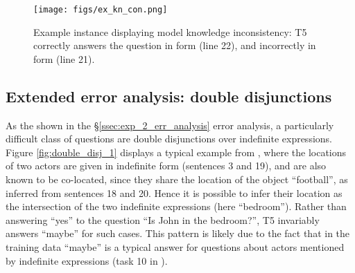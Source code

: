 \begin{figure}[]
\centering
\texttt{[image: figs/ex\_kn\_con.png]}

\caption{\label{fig:kn_con_example} Example  instance displaying model knowledge inconsistency: T5 correctly answers the question in \wherep form (line 22), and incorrectly in \yesno form (line 21).}
\end{figure}

\subsection{Extended error analysis: double disjunctions}
\label{ssec:ext_err_double_disj}

As the shown in the \S\ref{ssec:exp_2_err_analysis} error analysis, a particularly difficult class of questions are double disjunctions over indefinite expressions. Figure \ref{fig:double_disj_1} displays a typical example from , where the locations of two actors are given in indefinite form (sentences 3 and 19), and are also known to be co-located, since they share the location of the object ``football'', as inferred from sentences 18 and 20. Hence it is possible to infer their location as the intersection of the two indefinite expressions (here ``bedroom''). Rather than answering ``yes'' to the question ``Is John in the bedroom?'', T5 invariably answers ``maybe'' for such cases. This pattern is likely due to the fact that in the training data ``maybe'' is a typical answer for \yesno questions about actors mentioned by indefinite expressions (task 10 in \babibm).


